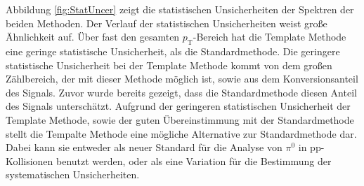 \newline
Abbildung \ref{fig:StatUncer} zeigt die statistischen Unsicherheiten der Spektren der beiden Methoden.
Der Verlauf der statistischen Unsicherheiten weist große Ähnlichkeit auf.
Über fast den gesamten $p_\text{T}$-Bereich hat die Template Methode eine geringe statistische Unsicherheit, als die Standardmethode.
Die geringere statistische Unsicherheit bei der Template Methode kommt von dem großen Zählbereich, der mit  dieser Methode möglich ist, sowie aus dem Konversionsanteil des Signals.
Zuvor wurde bereits gezeigt, dass die Standardmethode diesen Anteil des Signals unterschätzt.
\newline
Aufgrund der geringeren statistischen Unsicherheit der Template Methode, sowie der guten Über\-ein\-stim\-mung mit der Standardmethode stellt die Tempalte Methode eine mögliche Alternative zur Standardmethode dar.
Dabei kann sie entweder als neuer Standard für die Analyse von $\pi^{0}$ in pp-Kollisionen benutzt werden, oder als eine Variation für die Bestimmung der systematischen Unsicherheiten.
